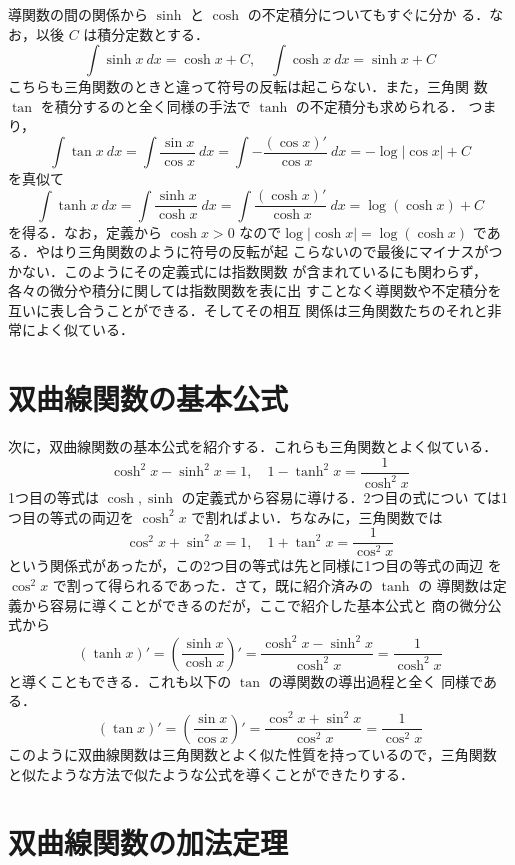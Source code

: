\documentclass[dvipdfmx,12pt, uplatex]{jsarticle}
\begin{document}
導関数の間の関係から $\sinh$ と $\cosh$ の不定積分についてもすぐに分か
る．なお，以後 $C$ は積分定数とする．
\[
\int \sinh x \ dx = \cosh x +C, \quad \int \cosh x \ dx = \sinh x +C
\]
こちらも三角関数のときと違って符号の反転は起こらない．また，三角関
数 $\tan$ を積分するのと全く同様の手法で $\tanh$ の不定積分も求められる．
つまり，
\[
  \int \tan x \ dx = \int \frac{\sin x}{\cos x} \ dx = \int
  -\frac{\left(\cos x\right)'}{\cos x} \ dx = -\log |\cos x | +C
\]
を真似て
\[
  \int \tanh x \ dx = \int \frac{\sinh x}{\cosh x} \ dx = \int
  \frac{\left( \cosh x \right)'}{\cosh x} \ dx = \log \left(\cosh x\right) +C
\]
を得る．なお，定義から $\cosh x >0$ なので$\log|\cosh x| =
\log\left(\cosh x\right)$ である．やはり三角関数のように符号の反転が起
こらないので最後にマイナスがつかない．このようにその定義式には指数関数
が含まれているにも関わらず，各々の微分や積分に関しては指数関数を表に出
すことなく導関数や不定積分を互いに表し合うことができる．そしてその相互
関係は三角関数たちのそれと非常によく似ている．

\section{双曲線関数の基本公式}
次に，双曲線関数の基本公式を紹介する．これらも三角関数とよく似ている．
\[
  \cosh^2 x - \sinh^2 x=1, \quad 1-\tanh^2 x = \frac{1}{\cosh^2 x}
\]
1つ目の等式は $\cosh, \sinh$ の定義式から容易に導ける．2つ目の式につい
ては1つ目の等式の両辺を $\cosh^2 x$ で割ればよい．ちなみに，三角関数では
\[
\cos^2 x + \sin^2 x = 1, \quad 1+\tan^2 x = \frac{1}{\cos^2 x}
\]
という関係式があったが，この2つ目の等式は先と同様に1つ目の等式の両辺
を $\cos^2 x$ で割って得られるであった．さて，既に紹介済みの $\tanh$ の
導関数は定義から容易に導くことができるのだが，ここで紹介した基本公式と
商の微分公式から
\[
  \left( \tanh x \right)' = \left( \frac{\sinh x}{\cosh x} \right)'
  =\frac{\cosh^2 x - \sinh^2 x}{\cosh^2 x} = \frac{1}{\cosh^2 x}
\]
と導くこともできる．これも以下の $\tan$ の導関数の導出過程と全く
同様である．
\[
  \left(\tan x\right)' = \left( \frac{\sin x}{\cos x}\right)' =
  \frac{\cos^2 x + \sin^2 x}{\cos^2 x} = \frac{1}{\cos^2 x}
\]
このように双曲線関数は三角関数とよく似た性質を持っているので，三角関数
と似たような方法で似たような公式を導くことができたりする．

\section{双曲線関数の加法定理}\label{addition}
\end{document}
